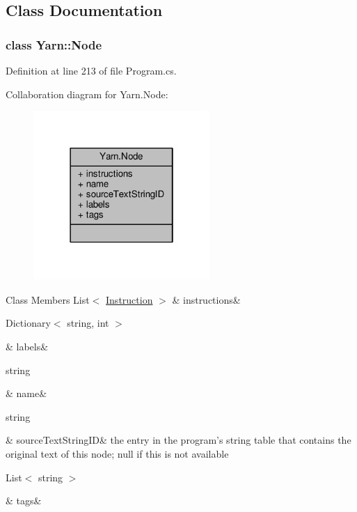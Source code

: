 \subsection{Class Documentation}
\label{a00351}
\hypertarget{a00048_a00351}{}
\subsubsection{class Yarn\-:\-:Node}


Definition at line 213 of file Program.\-cs.



Collaboration diagram for Yarn.\-Node\-:
\nopagebreak
\begin{figure}[H]
\begin{center}
\leavevmode
\includegraphics[width=190pt]{a00364}
\end{center}
\end{figure}
\begin{DoxyFields}{Class Members}
\hypertarget{a00048_a156723a9252b62d288ddf611939ea7c3}{List$<$ \hyperlink{a00113}{Instruction} $>$}\label{a00048_a156723a9252b62d288ddf611939ea7c3}
&
instructions&
\\
\hline

\hypertarget{a00048_a9afa49f4fbc72e806a0210cb4198f12e}{Dictionary$<$ string, int $>$}\label{a00048_a9afa49f4fbc72e806a0210cb4198f12e}
&
labels&
\\
\hline

\hypertarget{a00048_a107b0de3fcfc65e99913edc01b5ce9db}{string}\label{a00048_a107b0de3fcfc65e99913edc01b5ce9db}
&
name&
\\
\hline

\hypertarget{a00048_a09c6af5b50925d0876283b84281b3ed4}{string}\label{a00048_a09c6af5b50925d0876283b84281b3ed4}
&
source\-Text\-String\-I\-D&
the entry in the program's string table that contains the original text of this node; null if this is not available \\
\hline

\hypertarget{a00048_a811086feceebbe79a74eba071c1d516b}{List$<$ string $>$}\label{a00048_a811086feceebbe79a74eba071c1d516b}
&
tags&
\\
\hline

\end{DoxyFields}
